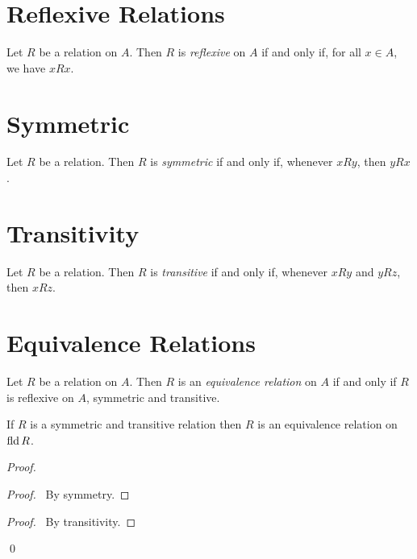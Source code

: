 \section{Reflexive Relations}

\begin{definition}
    Let $R$ be a relation on $A$. Then $R$ is \emph{reflexive} on $A$
    if and only if, for all $x \in A$, we have $xRx$.
\end{definition}

\section{Symmetric}

\begin{definition}
    Let $R$ be a relation. Then $R$ is \emph{symmetric} if and only if,
    whenever $xRy$, then $yRx$.
\end{definition}

\section{Transitivity}

\begin{definition}
    Let $R$ be a relation. Then $R$ is \emph{transitive} if and only if,
    whenever $xRy$ and $yRz$, then $xRz$.
\end{definition}

\section{Equivalence Relations}

\begin{definition}
    Let $R$ be a relation on $A$. Then $R$ is an \emph{equivalence relation}
    on $A$ if and only if $R$ is reflexive on $A$, symmetric and transitive.
\end{definition}

\begin{theorem}
    If $R$ is a symmetric and transitive relation then $R$ is an equivalence
    relation on $\operatorname{fld} R$.
\end{theorem}

\begin{proof}
    \pf
    \begin{proof}
        \pf\ By symmetry.
    \end{proof}
    \begin{proof}
        \pf\ By transitivity.
    \end{proof}
    \qed
\end{proof}

